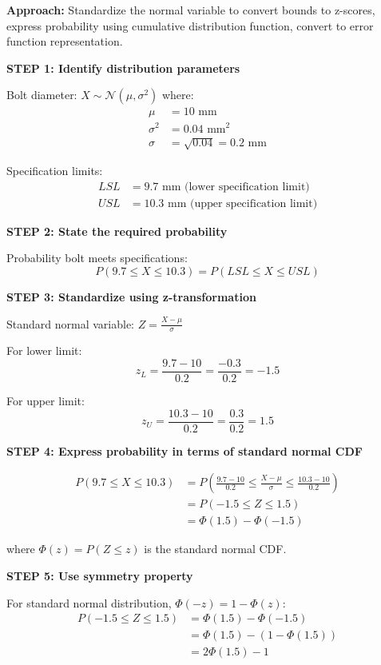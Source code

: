 \documentclass[12pt]{article}
\begin{document}
\begin{solution}

\textbf{Approach:} Standardize the normal variable to convert bounds to z-scores, express probability using cumulative distribution function, convert to error function representation.

\textbf{STEP 1: Identify distribution parameters}

Bolt diameter: $X \sim \mathcal{N}(\mu, \sigma^2)$ where:
\begin{align*}
\mu &= 10 \text{ mm} \\
\sigma^2 &= 0.04 \text{ mm}^2 \\
\sigma &= \sqrt{0.04} = 0.2 \text{ mm}
\end{align*}

Specification limits:
\begin{align*}
LSL &= 9.7 \text{ mm (lower specification limit)} \\
USL &= 10.3 \text{ mm (upper specification limit)}
\end{align*}

\textbf{STEP 2: State the required probability}

Probability bolt meets specifications:
\[
P(9.7 \leq X \leq 10.3) = P(LSL \leq X \leq USL)
\]

\textbf{STEP 3: Standardize using z-transformation}

Standard normal variable: $Z = \frac{X - \mu}{\sigma}$

For lower limit:
\[
z_L = \frac{9.7 - 10}{0.2} = \frac{-0.3}{0.2} = -1.5
\]

For upper limit:
\[
z_U = \frac{10.3 - 10}{0.2} = \frac{0.3}{0.2} = 1.5
\]

\textbf{STEP 4: Express probability in terms of standard normal CDF}

\begin{align*}
P(9.7 \leq X \leq 10.3) &= P\left(\frac{9.7-10}{0.2} \leq \frac{X-\mu}{\sigma} \leq \frac{10.3-10}{0.2}\right) \\
&= P(-1.5 \leq Z \leq 1.5) \\
&= \Phi(1.5) - \Phi(-1.5)
\end{align*}

where $\Phi(z) = P(Z \leq z)$ is the standard normal CDF.

\textbf{STEP 5: Use symmetry property}

For standard normal distribution, $\Phi(-z) = 1 - \Phi(z)$:
\begin{align*}
P(-1.5 \leq Z \leq 1.5) &= \Phi(1.5) - \Phi(-1.5) \\
&= \Phi(1.5) - (1 - \Phi(1.5)) \\
&= 2\Phi(1.5) - 1
\end{align*}


\end{solution}
\end{document}

